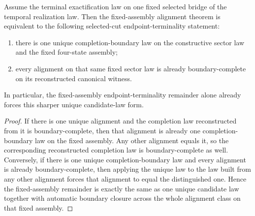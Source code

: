 \begin{theorem}
\label{thm:canonical-completion-boundary-law-fill-target-iff-canonical-law-native-alignment-boundary-target}
Assume the terminal exactification law on one fixed selected bridge of the
temporal realization law. Then the fixed-assembly alignment theorem is
equivalent to the following selected-cut endpoint-terminality statement:
\begin{enumerate}
\item there is one unique completion-boundary law on the constructive sector
law and the fixed four-state assembly;
\item every alignment on that same fixed sector law is already
boundary-complete on its reconstructed canonical witness.
\end{enumerate}
In particular, the fixed-assembly endpoint-terminality remainder alone already
forces this sharper unique candidate-law form.
\end{theorem}

\begin{proof}
If there is one unique alignment and the completion law reconstructed from it
is boundary-complete, then that alignment is already one completion-boundary
law on the fixed assembly. Any other alignment equals it, so the corresponding
reconstructed completion law is boundary-complete as well. Conversely, if
there is one unique completion-boundary law and every alignment is already
boundary-complete, then applying the unique law to the law built from any
other alignment forces that alignment to equal the distinguished one. Hence
the fixed-assembly remainder is exactly the same as one unique candidate law
together with automatic boundary closure across the whole alignment class on
that fixed assembly.
\end{proof}

